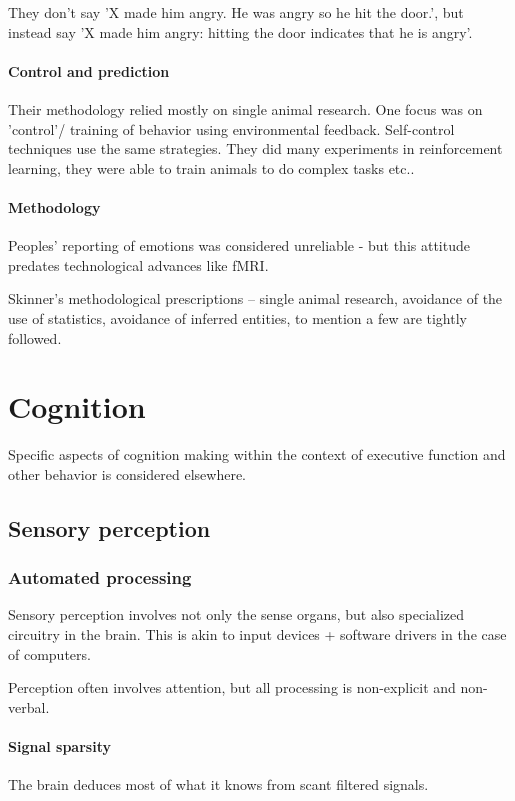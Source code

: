 \documentclass[oneside, article]{memoir}
\begin{document}
They don't say 'X made him angry. He was angry so he hit the door.', but instead say 'X made him angry: hitting the door indicates that he is angry'.

\subsection{Control and prediction}
Their methodology relied mostly on single animal research. One focus was on 'control'/ training of behavior using environmental feedback. Self-control techniques use the same strategies. They did many experiments in reinforcement learning, they were able to train animals to do complex tasks etc..

\subsection{Methodology}
Peoples' reporting of emotions was considered unreliable - but this attitude predates technological advances like fMRI.

Skinner's methodological prescriptions -- single animal research, avoidance of the use of statistics, avoidance of inferred entities, to mention a few are tightly followed.


\part{Cognition}
Specific aspects of cognition making within the context of executive function and other behavior is considered elsewhere.

\chapter{Sensory perception}
\section{Automated processing}
Sensory perception involves not only the sense organs, but also specialized circuitry in the brain. This is akin to input devices + software drivers in the case of computers.

Perception often involves attention, but all processing is non-explicit and non-verbal.

\subsection{Signal sparsity}
The brain deduces most of what it knows from scant filtered signals.
\end{document}
